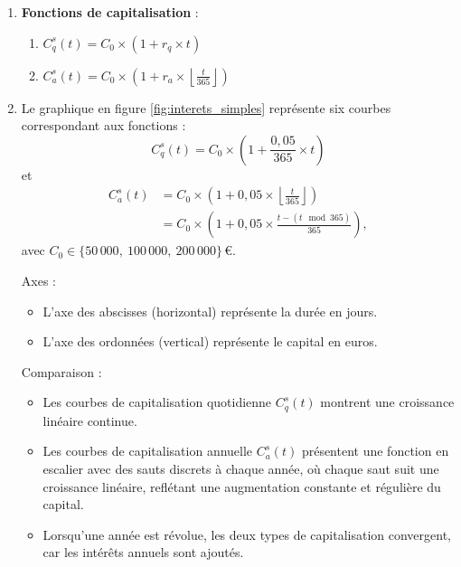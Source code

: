 \documentclass{article}
\begin{document}
\begin{enumerate}[label=\textbf{Q\arabic*.}]
    \item \textbf{Fonctions de capitalisation} :
    \begin{enumerate}[label=(\alph*)]
        \item \( C_q^s(t) = C_0 \times \left(1 + r_q \times t\right) \)
        \item \( C_a^s(t) = C_0 \times \left(1 + r_a \times \left\lfloor\frac{t}{365}\right\rfloor\right) \)
    \end{enumerate}

    \item Le graphique en figure \ref{fig:interets_simples} représente six courbes correspondant aux fonctions :
        \[
            C_q^s(t) = C_0 \times \left(1 + \frac{0{,}05}{365} \times t\right)
        \]
        et
        \[
        \begin{aligned}
            C_a^s(t) &= C_0 \times \left(1 + 0{,}05 \times \left\lfloor\frac{t}{365}\right\rfloor\right) \\
                     &= C_0 \times \left(1 + 0{,}05 \times \frac{t - (t \!\!\!\mod 365)}{365}\right),
        \end{aligned}
        \]
        avec \( C_0 \in \bigl\{50\,000,\ 100\,000,\ 200\,000\bigr\}\,\text{€} \).

    Axes :
    \begin{itemize}
        \item L'axe des abscisses (horizontal) représente la durée en jours.
        \item L'axe des ordonnées (vertical) représente le capital en euros.
    \end{itemize}

    Comparaison :
    \begin{itemize}
        \item Les courbes de capitalisation quotidienne $C_q^s(t)$ montrent une croissance linéaire continue.
        \item Les courbes de capitalisation annuelle $C_a^s(t)$ présentent une fonction en escalier avec des sauts discrets à chaque année, où chaque saut suit une croissance linéaire, reflétant une augmentation constante et régulière du capital.
        \item Lorsqu'une année est révolue, les deux types de capitalisation convergent, car les intérêts annuels sont ajoutés.
    \end{itemize}


\end{enumerate}
\end{document}
